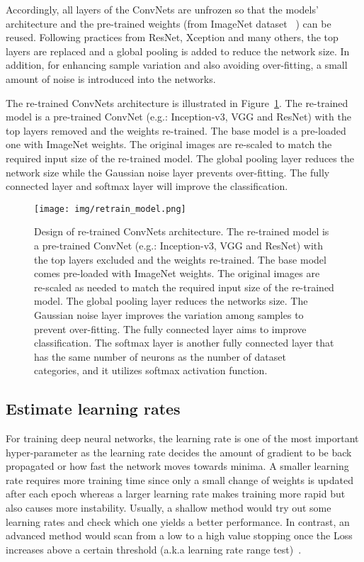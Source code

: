 \documentclass{ieeeaccess}
\begin{document}
Accordingly, all layers of the ConvNets are unfrozen so that the models' architecture and the pre-trained weights (from ImageNet dataset ~\cite{krizhevsky2012imagenet,russakovsky2015imagenet}) can be reused. Following practices from ResNet, Xception and many others, the top layers are replaced and a global pooling is added to reduce the network size. In addition, for enhancing sample variation and also avoiding over-fitting, a small amount of noise is introduced into the networks. 

The re-trained ConvNets architecture is illustrated in Figure~\ref{fig:retrain_model}. The re-trained model is a pre-trained ConvNet (e.g.: Inception-v3, VGG and ResNet) with the top layers removed and the weights re-trained. The base model is a pre-loaded one with ImageNet weights. The original images are re-scaled to match the required input size of the re-trained model. The global pooling layer reduces the network size while the Gaussian noise layer prevents over-fitting. The fully connected layer and softmax layer will improve the classification.
\begin{figure}[htbp!]
\begin{center}
\texttt{[image: img/retrain\_model.png]}
\caption{Design of re-trained ConvNets architecture. The re-trained model is a pre-trained ConvNet (e.g.: Inception-v3, VGG and ResNet) with the top layers excluded and the weights re-trained. The base model comes pre-loaded with ImageNet weights. The original images are re-scaled as needed to match the required input size of the re-trained model. The global pooling layer reduces the networks size. The Gaussian noise layer improves the variation among samples to prevent over-fitting. The fully connected layer aims to improve classification. The softmax layer is another fully connected layer that has the same number of neurons as the number of dataset categories, and it utilizes softmax activation function.}
\label{fig:retrain_model}
\end{center}
\end{figure}
\subsection{Estimate learning rates}
\label{experiments0}
For training deep neural networks, the learning rate is one of the most important hyper-parameter as the learning rate decides the amount of gradient to be back propagated or how fast the network moves towards minima. A smaller learning rate requires more training time since only a small change of weights is updated after each epoch whereas a larger learning rate makes training more rapid but also causes more instability. Usually, a shallow method would try out some learning rates and check which one yields a better performance. In contrast, an advanced method would scan from a low to a high value stopping once the Loss increases above a certain threshold (a.k.a learning rate range test)~\cite{smith2017cyclical}.
\end{document}
